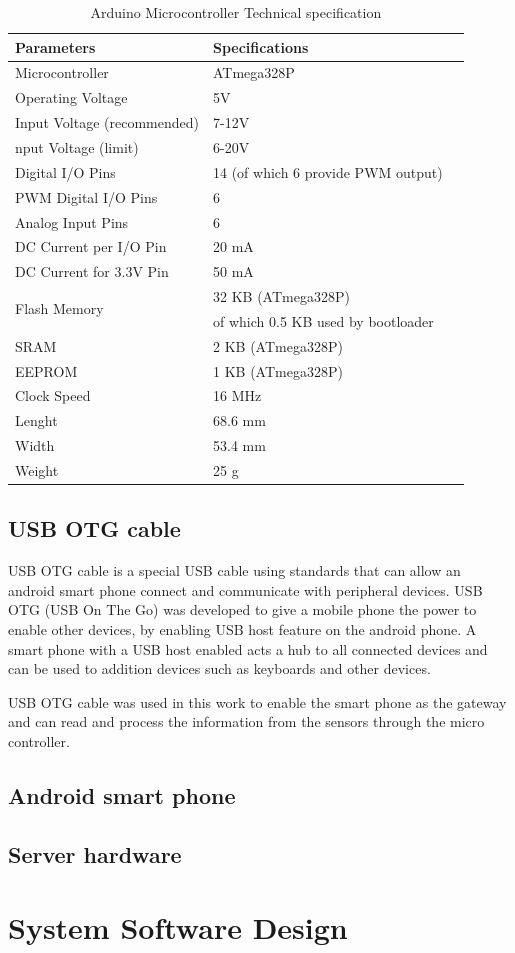 \begin{table}[H]
\begin{center}
    \begin{tabular}{ |l|l|l| }
\hline
{\bfseries Parameters} & {\bfseries Specifications} \\ \hline
Microcontroller & ATmega328P \\ \hline
Operating Voltage & 5V \\ \hline
Input Voltage (recommended) & 7-12V \\ \hline
nput Voltage (limit) & 6-20V \\ \hline
Digital I/O Pins & 14 (of which 6 provide PWM output) \\ \hline
PWM Digital I/O Pins & 6 \\ \hline
Analog Input Pins & 6 \\ \hline
DC Current per I/O Pin & 20 mA \\ \hline
DC Current for 3.3V Pin & 50 mA \\ \hline
\multirow{2}{*}{Flash Memory} 
 & 32 KB (ATmega328P)  \\
 & of which 0.5 KB used by bootloader\\
\hline
SRAM & 2 KB (ATmega328P)\\ \hline
EEPROM & 1 KB (ATmega328P) \\ \hline
Clock Speed & 16 MHz \\ \hline
Lenght & 68.6 mm \\ \hline
Width & 53.4 mm \\ \hline
Weight & 25 g \\ 
\hline

\end{tabular}
\end{center}
\caption{Arduino Microcontroller Technical specification\cite{ArduinoUnoSpecs}}\label{Microcontroller}
\end{table}


\subsection{USB OTG cable }
USB OTG cable is a special USB cable using standards that can allow an android smart phone connect and communicate with peripheral devices. USB OTG (USB On The Go) was developed to give a mobile phone the power to enable other devices, by enabling USB host feature on the android phone. A smart phone with a USB host enabled acts a hub to all connected devices and can be used to addition devices such as keyboards and other devices.

USB OTG cable was used in this work to enable the smart phone as the gateway and can read and process the information from the sensors through the micro controller.

\subsection{Android smart phone}
\subsection{Server hardware}
\section{System Software Design}
